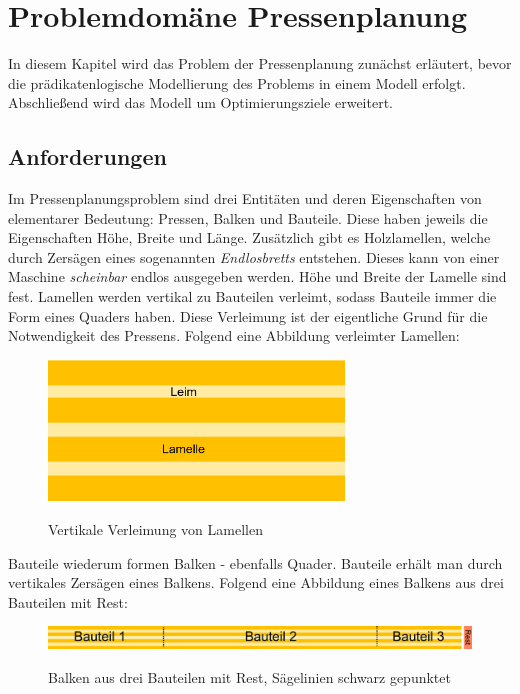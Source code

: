 \chapter{Problemdomäne Pressenplanung}
\label{chapter:problem}
In diesem Kapitel wird das Problem der Pressenplanung zunächst erläutert,
bevor die prädikatenlogische Modellierung des Problems in einem Modell erfolgt.
Abschließend wird das Modell um Optimierungsziele erweitert.

\section{Anforderungen}
\label{sec:anforderungen}
Im Pressenplanungsproblem sind drei Entitäten und deren Eigenschaften von elementarer Bedeutung: Pressen, Balken und Bauteile.
Diese haben jeweils die Eigenschaften Höhe, Breite und Länge.
Zusätzlich gibt es Holzlamellen, welche durch Zersägen eines sogenannten \textit{Endlosbretts} entstehen.
Dieses kann von einer Maschine \textit{scheinbar} endlos ausgegeben werden.
Höhe und Breite der Lamelle sind fest.
Lamellen werden vertikal zu Bauteilen verleimt, sodass Bauteile immer die Form eines Quaders haben.
Diese Verleimung ist der eigentliche Grund für die Notwendigkeit des Pressens.
Folgend eine Abbildung verleimter Lamellen:

\begin{figure}[h]
    \centering
    \includegraphics[width=0.70\textwidth, center]{Images/LammelleLeim}\\
    \caption{Vertikale Verleimung von Lamellen}
    \label{figure:lamelleleim}
\end{figure}

Bauteile wiederum formen Balken - ebenfalls Quader.
Bauteile erhält man durch vertikales Zersägen eines Balkens.
Folgend eine Abbildung eines Balkens aus drei Bauteilen mit Rest:

\begin{figure}[h]
    \centering
    \includegraphics[width=1.00\textwidth, center]{Images/BalkenBauteileRest}\\
    \caption{Balken aus drei Bauteilen mit Rest, Sägelinien schwarz gepunktet}
    \label{figure:balkenbauteilerest}
\end{figure}

